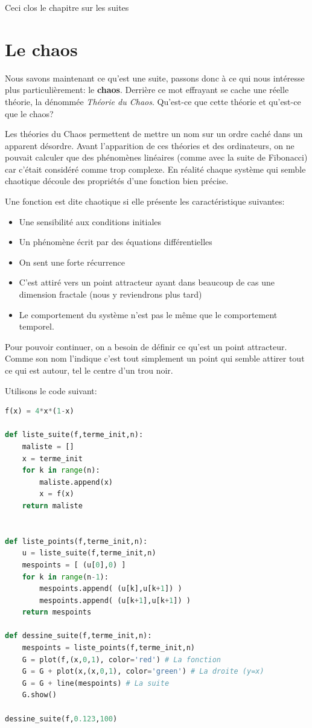 \documentclass[french,11pt]{report}
\begin{document}
Ceci clos le chapitre sur les suites


\chapter{Le chaos}

Nous savons maintenant ce qu'est une suite, passons donc à ce qui nous intéresse plus particulièrement: le \textbf{chaos}.
Derrière ce mot effrayant se cache une réelle théorie, la dénommée \textit{Théorie du Chaos}.
Qu'est-ce que cette théorie et qu'est-ce que le chaos?


Les théories du Chaos permettent de mettre un nom sur un ordre caché dans un apparent désordre. Avant l’apparition de ces théories et des ordinateurs, on ne pouvait calculer que des phénomènes linéaires (comme avec la suite de Fibonacci) car c’était considéré comme trop complexe. En réalité chaque système qui semble chaotique découle des propriétés d’une fonction bien précise. 

Une fonction est dite chaotique si elle présente les caractéristique suivantes:
\begin{itemize}
    \item Une sensibilité aux conditions initiales
    \item Un phénomène écrit par des équations différentielles
    \item On sent une forte récurrence
    \item C’est attiré vers un point attracteur ayant dans beaucoup de cas une dimension fractale (nous y reviendrons plus tard)
    \item Le comportement du système n’est pas le même que le comportement temporel. \\
\end{itemize}


Pour pouvoir continuer, on a besoin de définir ce qu’est un point attracteur. Comme son nom l’indique c’est tout simplement un point qui semble attirer tout ce qui est autour, tel le centre d’un trou noir.

Utilisons le code suivant:
\begin{lstlisting}[language=python]
f(x) = 4*x*(1-x)

def liste_suite(f,terme_init,n):
	maliste = []
	x = terme_init
	for k in range(n):
		maliste.append(x)
		x = f(x)
	return maliste


def liste_points(f,terme_init,n):
	u = liste_suite(f,terme_init,n)
	mespoints = [ (u[0],0) ]
	for k in range(n-1):
		mespoints.append( (u[k],u[k+1]) )
		mespoints.append( (u[k+1],u[k+1]) )
	return mespoints

def dessine_suite(f,terme_init,n):
	mespoints = liste_points(f,terme_init,n)
	G = plot(f,(x,0,1), color='red') # La fonction
	G = G + plot(x,(x,0,1), color='green') # La droite (y=x)
	G = G + line(mespoints) # La suite
	G.show()

dessine_suite(f,0.123,100)
\end{lstlisting}
\end{document}
